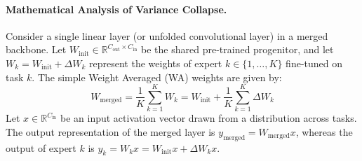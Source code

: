 \documentclass{article}
\theoremstyle{plain}
\theoremstyle{definition}
\theoremstyle{remark}
\begin{document}
\paragraph{Mathematical Analysis of Variance Collapse.}
Consider a single linear layer (or unfolded convolutional layer) in a merged backbone. Let $W_{\text{init}} \in \mathbb{R}^{C_{\text{out}} \times C_{\text{in}}}$ be the shared pre-trained progenitor, and let $W_k = W_{\text{init}} + \Delta W_k$ represent the weights of expert $k \in \{1, \dots, K\}$ fine-tuned on task $k$. The simple Weight Averaged (WA) weights are given by:
\begin{equation}
    W_{\text{merged}} = \frac{1}{K} \sum_{k=1}^K W_k = W_{\text{init}} + \frac{1}{K} \sum_{k=1}^K \Delta W_k
\end{equation}
Let $x \in \mathbb{R}^{C_{\text{in}}}$ be an input activation vector drawn from a distribution across tasks. The output representation of the merged layer is $y_{\text{merged}} = W_{\text{merged}} x$, whereas the output of expert $k$ is $y_k = W_k x = W_{\text{init}} x + \Delta W_k x$. 
\end{document}

